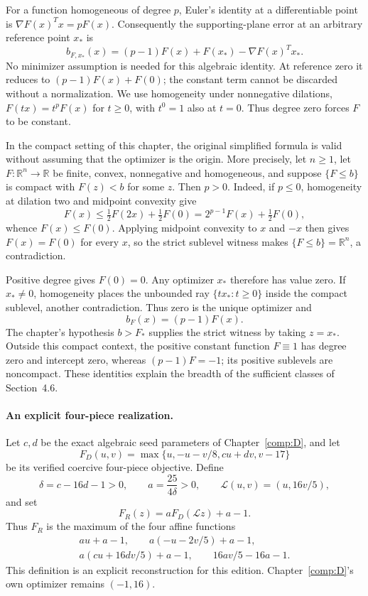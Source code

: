 For a function homogeneous of degree $p$, Euler's identity at a differentiable point is $\nabla F(x)^Tx=pF(x)$. Consequently the supporting-plane error at an arbitrary reference point $x_*$ is
\[
 b_{F,x_*}(x)=(p-1)F(x)+F(x_*)-\nabla F(x)^Tx_*.
\]
No minimizer assumption is needed for this algebraic identity. At reference zero it reduces to $(p-1)F(x)+F(0)$; the constant term cannot be discarded without a normalization. We use homogeneity under nonnegative dilations, $F(tx)=t^pF(x)$ for $t\ge0$, with $t^0=1$ also at $t=0$. Thus degree zero forces $F$ to be constant.

In the compact setting of this chapter, the original simplified formula is valid without assuming that the optimizer is the origin. More precisely, let $n\ge1$, let $F:\mathbb R^n\to\mathbb R$ be finite, convex, nonnegative and homogeneous, and suppose $\{F\le b\}$ is compact with $F(z)<b$ for some $z$. Then $p>0$. Indeed, if $p\le0$, homogeneity at dilation two and midpoint convexity give
\[
 F(x)\le\tfrac12F(2x)+\tfrac12F(0)
       =2^{p-1}F(x)+\tfrac12F(0),
\]
whence $F(x)\le F(0)$. Applying midpoint convexity to $x$ and $-x$ then gives $F(x)=F(0)$ for every $x$, so the strict sublevel witness makes $\{F\le b\}=\mathbb R^n$, a contradiction.

Positive degree gives $F(0)=0$. Any optimizer $x_*$ therefore has value zero. If $x_*\ne0$, homogeneity places the unbounded ray $\{t x_*:t\ge0\}$ inside the compact sublevel, another contradiction. Thus zero is the unique optimizer and
\[
 b_F(x)=(p-1)F(x).
\]
The chapter's hypothesis $b>F_*$ supplies the strict witness by taking $z=x_*$. Outside this compact context, the positive constant function $F\equiv1$ has degree zero and intercept zero, whereas $(p-1)F=-1$; its positive sublevels are noncompact. These identities explain the breadth of the sufficient classes of Section~4.6.

\paragraph{An explicit four-piece realization.}
Let $c,d$ be the exact algebraic seed parameters of Chapter~\ref{comp:D}, and let
\[
 F_D(u,v)=\max\{u,-u-v/8,cu+dv,v-17\}
\]
be its verified coercive four-piece objective. Define
\[
 \delta=c-16d-1>0,\qquad a=\frac{25}{4\delta}>0,
 \qquad \mathcal L(u,v)=(u,16v/5),
\]
and set
\[
 F_R(z)=aF_D(\mathcal L z)+a-1.
\]
Thus $F_R$ is the maximum of the four affine functions
\[
 \begin{gathered}
 au+a-1,\qquad a(-u-2v/5)+a-1,\\
 a(cu+16dv/5)+a-1,\qquad 16av/5-16a-1.
 \end{gathered}
\]
This definition is an explicit reconstruction for this edition. Chapter~\ref{comp:D}'s own optimizer remains $(-1,16)$.

